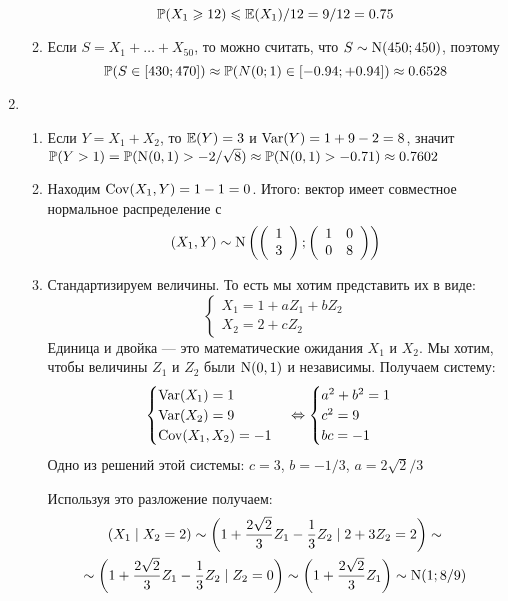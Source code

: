 \begin{enumerate}
\begin{enumerate}
\[
\P(X_1 \geq 12)\leq \E(X_1)/12=9/12=0.75
\]
\item Если $S=X_1+\ldots+X_{50}$, то можно считать, что $S\sim \cN(450;450)$, поэтому
\[
\P(S \in [430;470])\approx \P( N(0;1) \in [-0.94;+0.94])\approx 0.6528
\]
\end{enumerate}
\item
\begin{enumerate}
\item Если $Y = X_1 + X_2$, то $\E(Y) = 3$ и $\Var(Y) = 1 + 9 - 2 = 8$, значит
$\P(Y > 1) = \P(\cN(0,1) > -2/\sqrt{8}) \approx \P(\cN(0,1) > -0.71) \approx 0.7602$
\item Находим $\Cov(X_1, Y) = 1 - 1 = 0$. Итого: вектор имеет совместное нормальное
распределение с
\[
(X_1,Y) \sim \cN\left(
\left(\begin{array}{l}
{1} \\
{3}
\end{array}\right);
\left(\begin{array}{cc}
{1} & {0} \\
{0} & {8}
\end{array}\right)
\right)
\]
\item Стандартизируем величины. То есть мы хотим представить их в виде:
\[
\begin{cases}
X_1 = 1 + aZ_1 + bZ_2 \\
X_2 = 2 + cZ_2
\end{cases}
\]
Единица и двойка — это математические ожидания $X_1$ и $X_2$. Мы хотим, чтобы
величины $Z_1$ и $Z_2$ были $\cN(0,1)$ и независимы.
Получаем систему:
\[
\begin{cases}
\Var(X_1) = 1 \\
\Var(X_2) = 9 \\
\Cov(X_1,X_2) = -1
\end{cases} \Leftrightarrow
\begin{cases}
a^2 + b^2 = 1 \\
c^2 = 9 \\
bc = -1
\end{cases}
\]
Одно из решений этой системы: $c = 3$, $b = -1/3$, $a = 2\sqrt{2}/3$

Используя это разложение получаем:
\begin{multline*}
\left( X_1 \mid X_2 = 2\right) \sim \left(1 + \frac{2\sqrt{2}}{3}Z_1-\frac{1}{3}Z_2 \mid 2 + 3Z_2 = 2\right)\sim \\
\sim\left(1 + \frac{2\sqrt{2}}{3}Z_1 - \frac{1}{3}Z_2\mid Z_2 = 0\right) \sim \left(1 + \frac{2\sqrt{2}}{3}Z_1\right)\sim \cN(1;8/9)
\end{multline*}


\end{enumerate}
\end{enumerate}
